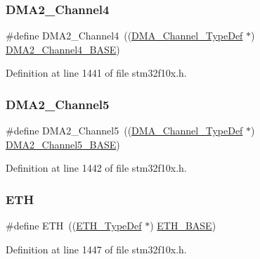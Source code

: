 \subsubsection{\texorpdfstring{D\+M\+A2\+\_\+\+Channel4}{DMA2\_Channel4}}
{\footnotesize\ttfamily \#define D\+M\+A2\+\_\+\+Channel4~((\hyperlink{struct_d_m_a___channel___type_def}{D\+M\+A\+\_\+\+Channel\+\_\+\+Type\+Def} $\ast$) \hyperlink{group___peripheral__memory__map_ga01b063266473f290a55047654fbbfbee}{D\+M\+A2\+\_\+\+Channel4\+\_\+\+B\+A\+SE})}



Definition at line 1441 of file stm32f10x.\+h.

\mbox{\label{group___peripheral__declaration_ga521c13b7d0f82a6897d47995da392750}} 
\subsubsection{\texorpdfstring{D\+M\+A2\+\_\+\+Channel5}{DMA2\_Channel5}}
{\footnotesize\ttfamily \#define D\+M\+A2\+\_\+\+Channel5~((\hyperlink{struct_d_m_a___channel___type_def}{D\+M\+A\+\_\+\+Channel\+\_\+\+Type\+Def} $\ast$) \hyperlink{group___peripheral__memory__map_ga1eea983a5d68bf36f4d19fbb07955ca1}{D\+M\+A2\+\_\+\+Channel5\+\_\+\+B\+A\+SE})}



Definition at line 1442 of file stm32f10x.\+h.

\mbox{\label{group___peripheral__declaration_ga3a3f60de4318afbd0b3318e7a416aadc}} 
\subsubsection{\texorpdfstring{E\+TH}{ETH}}
{\footnotesize\ttfamily \#define E\+TH~((\hyperlink{struct_e_t_h___type_def}{E\+T\+H\+\_\+\+Type\+Def} $\ast$) \hyperlink{group___peripheral__memory__map_gad965a7b1106ece575ed3da10c45c65cc}{E\+T\+H\+\_\+\+B\+A\+SE})}



Definition at line 1447 of file stm32f10x.\+h.

